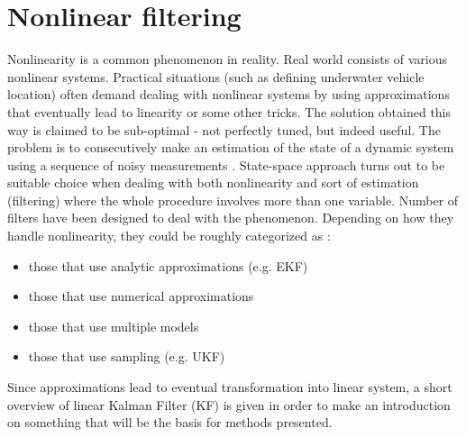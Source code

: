 \chapter{Nonlinear filtering} \label{chap:kalman}
Nonlinearity is a common phenomenon in reality. Real world consists of various nonlinear systems. Practical situations (such as defining underwater vehicle location) often demand dealing with nonlinear systems by using approximations that eventually lead to linearity or some other tricks. The solution obtained this way is claimed to be sub-optimal - not perfectly tuned, but indeed useful. The problem is to consecutively make an estimation of the state of a dynamic system using a sequence of noisy measurements \cite{ristic04}. State-space approach turns out to be suitable choice when dealing with both nonlinearity and sort of estimation (filtering) where the whole procedure involves more than one variable. Number of filters have been designed to deal with the phenomenon. Depending on how they handle nonlinearity, they could be roughly categorized as \cite{ristic04}: 
\begin{itemize}
\item those that use analytic approximations (e.g. EKF)
\item those that use numerical approximations
\item those that use multiple models
\item those that use sampling (e.g. UKF)
\end{itemize} 
Since approximations lead to eventual transformation into linear system, a short overview of linear Kalman Filter (KF) is given in order to make an introduction on something that will be the basis for methods presented.
